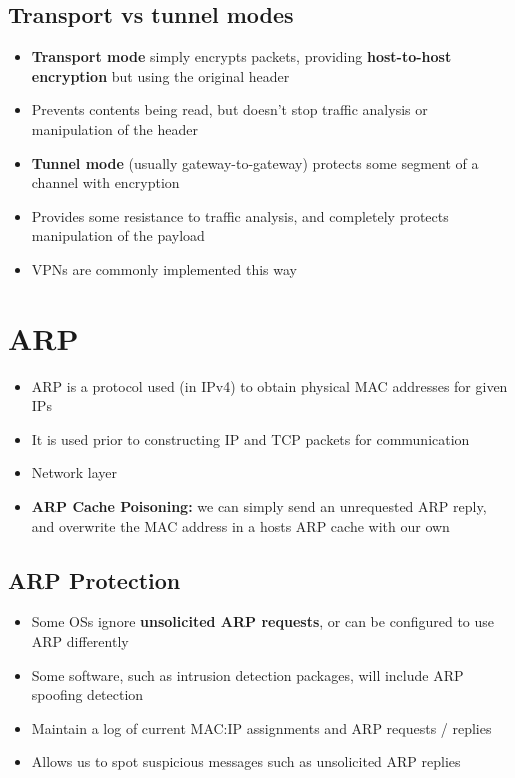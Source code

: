\documentclass{article}
\begin{document}
\subsection{Transport vs tunnel modes}
\begin{itemize}
  \item \textbf{Transport mode} simply encrypts packets, providing \textbf{host-to-host encryption} but using the original header 
  \item Prevents contents being read, but doesn’t stop traffic analysis or manipulation of the header
  \item \textbf{Tunnel mode} (usually gateway-to-gateway) protects some segment of a channel with encryption 
  \item Provides some resistance to traffic analysis, and completely protects manipulation of the payload 
  \item VPNs are commonly implemented this way
\end{itemize}

\section{ARP}
\begin{itemize}
  \item ARP is a protocol used (in IPv4) to obtain physical MAC addresses for given IPs 
  \item It is used prior to constructing IP and TCP packets for communication 
  \item Network layer
  \item \textbf{ARP Cache Poisoning:} we can simply send an unrequested ARP reply, and overwrite the MAC address in a hosts ARP cache with our own
\end{itemize}

\subsection{ARP Protection}
\begin{itemize}
  \item Some OSs ignore \textbf{unsolicited ARP requests}, or can be configured to use ARP differently 
  \item Some software, such as intrusion detection packages, will include ARP spoofing detection 
  \item Maintain a log of current MAC:IP assignments and ARP requests / replies 
  \item Allows us to spot suspicious messages such as unsolicited ARP replies
\end{itemize}
\end{document}
